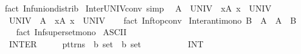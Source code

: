 \begin{isabellebody}
\isamarkupfalse%
\ {\isacharparenleft}{\kern0pt}fact\ Inf{\isacharunderscore}{\kern0pt}union{\isacharunderscore}{\kern0pt}distrib{\isacharparenright}{\kern0pt}%
\endisatagproof
{\isafoldproof}%
%
\isadelimproof
\isanewline
%
\endisadelimproof
\isanewline
{}\isamarkupfalse%
\ Inter{\isacharunderscore}{\kern0pt}UNIV{\isacharunderscore}{\kern0pt}conv\ {\isacharbrackleft}{\kern0pt}simp{\isacharbrackright}{\kern0pt}{\isacharcolon}{\kern0pt}\isanewline
\ \ {\isachardoublequoteopen}{\isasymInter}A\ {\isacharequal}{\kern0pt}\ UNIV\ {\isasymlongleftrightarrow}\ {\isacharparenleft}{\kern0pt}{\isasymforall}x{\isasymin}A{\isachardot}{\kern0pt}\ x\ {\isacharequal}{\kern0pt}\ UNIV{\isacharparenright}{\kern0pt}{\isachardoublequoteclose}\isanewline
\ \ {\isachardoublequoteopen}UNIV\ {\isacharequal}{\kern0pt}\ {\isasymInter}A\ {\isasymlongleftrightarrow}\ {\isacharparenleft}{\kern0pt}{\isasymforall}x{\isasymin}A{\isachardot}{\kern0pt}\ x\ {\isacharequal}{\kern0pt}\ UNIV{\isacharparenright}{\kern0pt}{\isachardoublequoteclose}\isanewline
%
\isadelimproof
\ \ %
\endisadelimproof
%
\isatagproof
{}\isamarkupfalse%
\ {\isacharparenleft}{\kern0pt}fact\ Inf{\isacharunderscore}{\kern0pt}top{\isacharunderscore}{\kern0pt}conv{\isacharparenright}{\kern0pt}{\isacharplus}{\kern0pt}%
\endisatagproof
{\isafoldproof}%
%
\isadelimproof
\isanewline
%
\endisadelimproof
\isanewline
{}\isamarkupfalse%
\ Inter{\isacharunderscore}{\kern0pt}anti{\isacharunderscore}{\kern0pt}mono{\isacharcolon}{\kern0pt}\ {\isachardoublequoteopen}B\ {\isasymsubseteq}\ A\ {\isasymLongrightarrow}\ {\isasymInter}A\ {\isasymsubseteq}\ {\isasymInter}B{\isachardoublequoteclose}\isanewline
%
\isadelimproof
\ \ %
\endisadelimproof
%
\isatagproof
{}\isamarkupfalse%
\ {\isacharparenleft}{\kern0pt}fact\ Inf{\isacharunderscore}{\kern0pt}superset{\isacharunderscore}{\kern0pt}mono{\isacharparenright}{\kern0pt}%
\endisatagproof
{\isafoldproof}%
%
\isadelimproof
%
\endisadelimproof
%
\isadelimdocument
%
\endisadelimdocument
%
\isatagdocument
%
\isamarkuptrue%
%
\endisatagdocument
{\isafolddocument}%
%
\isadelimdocument
%
\endisadelimdocument
{}\isamarkupfalse%
\ {\isacharparenleft}{\kern0pt}ASCII{\isacharparenright}{\kern0pt}\isanewline
\ \ {\isachardoublequoteopen}{\isacharunderscore}{\kern0pt}INTER{}{\isachardoublequoteclose}\ \ \ \ \ {\isacharcolon}{\kern0pt}{\isacharcolon}{\kern0pt}\ {\isachardoublequoteopen}pttrns\ {\isasymRightarrow}\ {\isacharprime}{\kern0pt}b\ set\ {\isasymRightarrow}\ {\isacharprime}{\kern0pt}b\ set{\isachardoublequoteclose}\ \ \ \ \ \ \ \ \ \ \ {\isacharparenleft}{\kern0pt}{\isachardoublequoteopen}{\isacharparenleft}{\kern0pt}{}INT\ {\isacharunderscore}{\kern0pt}{\isachardot}{\kern0pt}{\isacharslash}{\kern0pt}\ {\isacharunderscore}{\kern0pt}{\isacharparenright}{\kern0pt}{\isachardoublequoteclose}\ {\isacharbrackleft}{\kern0pt}{}{\isacharcomma}{\kern0pt}\ {}{}{\isacharbrackright}{\kern0pt}\ {}{}{\isacharparenright}{\kern0pt}\isanewline

\end{isabellebody}
